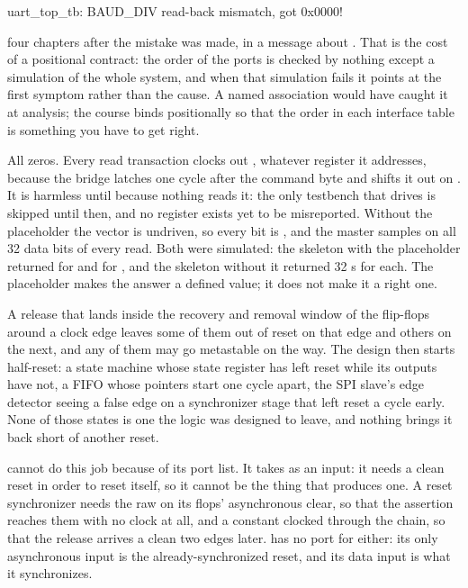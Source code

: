 \begin{console}
uart_top_tb: BAUD_DIV read-back mismatch, got 0x0000!
\end{console}

\noindent four chapters after the mistake was made, in a message about . That is the
cost of a positional contract: the order of the ports is checked by nothing except a simulation of
the whole system, and when that simulation fails it points at the first symptom rather than the
cause. A named association would have caught it at analysis; the course binds positionally so that
the order in each interface table is something you have to get right.

 All zeros. Every read transaction clocks out , whatever register it
addresses, because the bridge latches  one cycle after the command byte and shifts
it out on . It is harmless until  because nothing reads it: the only testbench
that drives  is skipped until then, and no register exists yet to be misreported.
Without the placeholder the vector is undriven, so every bit is , and the master samples
 on all 32 data bits of every read. Both were simulated: the skeleton with the placeholder
returned  for  and for , and the
skeleton without it returned 32 s for each. The placeholder makes the answer a defined
value; it does not make it a right one.

 A release that lands inside the recovery and removal window of the flip-flops around a
clock edge leaves some of them out of reset on that edge and others on the next, and any of them
may go metastable on the way. The design then starts half-reset: a state machine whose state
register has left reset while its outputs have not, a FIFO whose pointers start one cycle apart,
the SPI slave's edge detector seeing a false edge on a synchronizer stage that left reset a cycle
early. None of those states is one the logic was designed to leave, and nothing brings it back
short of another reset.

 cannot do this job because of its port list. It takes  as an input:
it needs a clean reset in order to reset itself, so it cannot be the thing that produces one. A reset
synchronizer needs the raw  on its flops' asynchronous clear, so that the assertion
reaches them with no clock at all, and a constant  clocked through the chain, so that the
release arrives a clean two edges later.  has no port for either: its only asynchronous
input is the already-synchronized reset, and its data input is what it synchronizes.

